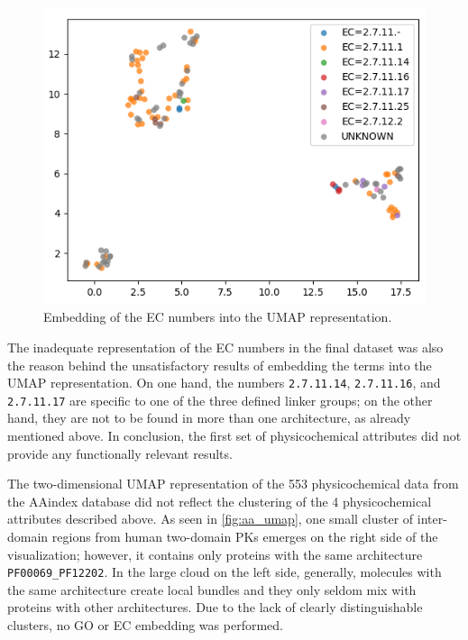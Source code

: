 		\begin{figure}
			\centering
			\includegraphics[width=0.8\linewidth]{img/linker_umap_ec.png}
			\caption{Embedding of the EC numbers into the UMAP representation.}
			\label{fig:umap_ec}
		\end{figure}

		The inadequate representation of the EC numbers in the final dataset was also the
		reason behind the unsatisfactory results of embedding the terms into the UMAP
		representation.
		On one hand, the numbers \texttt{2.7.11.14}, \texttt{2.7.11.16}, and
		\texttt{2.7.11.17} are specific to one of the three defined linker groups; on the
		other hand, they are not to be found in more than one architecture, as already
		mentioned above.
		In conclusion, the first set of physicochemical attributes did not provide any
		functionally relevant results.

\label{res:second}

	The two-dimensional UMAP representation of the 553 physicochemical data from the AAindex
	database did not reflect the clustering of the 4 physicochemical attributes described
	above.
	As seen in \cref{fig:aa_umap}, one small cluster of inter-domain regions from human
	two-domain PKs emerges on the right side of the visualization; however, it contains only
	proteins with the same architecture \texttt{PF00069\_PF12202}.
	In the large cloud on the left side, generally, molecules with the same architecture
	create local bundles and they only seldom mix with proteins with other architectures.
	Due to the lack of clearly distinguishable clusters, no GO or EC embedding was
	performed.

